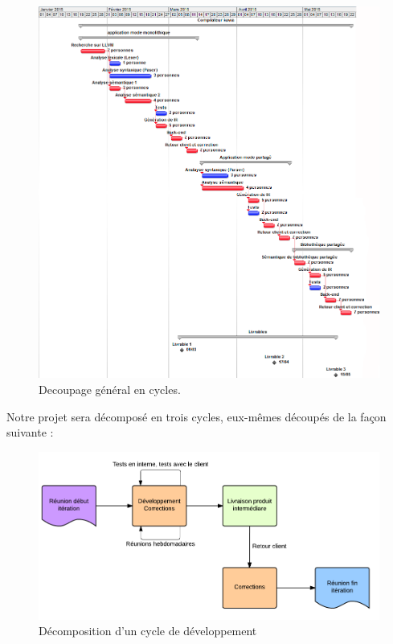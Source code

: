 \documentclass{../res/univ-projet}
\begin{document}
    \begin{figure}[!h]
      \includegraphics[width=17.8cm]{fig/decoupage_cycles.png}
      \caption{Decoupage général en cycles.}
      \label{decoupage_cycles}
    \end{figure}
    \newpage
    Notre projet sera décomposé en trois cycles, eux-mêmes découpés de la façon suivante :

    \begin{figure}[!h]
      \includegraphics[width=17.8cm]{fig/decomposition_cycle.png}
      \caption{Décomposition d'un cycle de développement}
      \label{decomposition_cycle}
    \end{figure}
\end{document}
